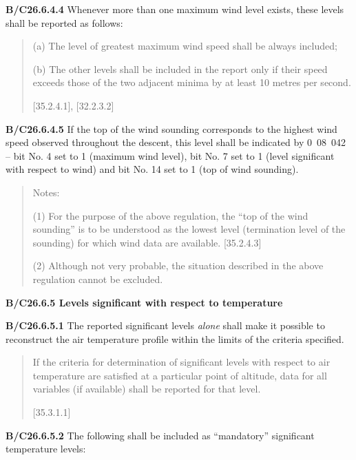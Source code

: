 \textbf{B/C26.6.4.4} Whenever more than one maximum wind level exists, these levels shall be reported as follows:

\begin{quote}
(a) The level of greatest maximum wind speed shall be always included;

(b) The other levels shall be included in the report only if their speed exceeds those of the two adjacent minima by at least 10 metres per second.

{[}35.2.4.1{]}, {[}32.2.3.2{]}
\end{quote}

\textbf{B/C26.6.4.5} If the top of the wind sounding corresponds to the highest wind speed observed throughout the descent, this level shall be indicated by 0~08~042 -- bit No. 4 set to 1 (maximum wind level), bit No. 7 set to 1 (level significant with respect to wind) and bit No. 14 set to 1 (top of wind sounding).

\begin{quote}
Notes:

(1) For the purpose of the above regulation, the ``top of the wind sounding'' is to be understood as the lowest level (termination level of the sounding) for which wind data are available. {[}35.2.4.3{]}

(2) Although not very probable, the situation described in the above regulation cannot be excluded.
\end{quote}

\textbf{B/C26.6.5 Levels significant with respect to temperature}

\textbf{B/C26.6.5.1} The reported significant levels \emph{alone} shall make it possible to reconstruct the air temperature profile within the limits of the criteria specified.

\begin{quote}
If the criteria for determination of significant levels with respect to air temperature are satisfied at a particular point of altitude, data for all variables (if available) shall be reported for that level.

{[}35.3.1.1{]}
\end{quote}

\textbf{B/C26.6.5.2} The following shall be included as ``mandatory'' significant temperature levels:


